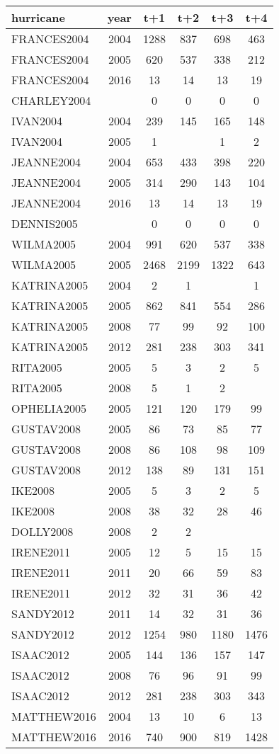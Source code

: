 \begin{tabular}{lccccc}
  \hline
hurricane & year & t+1 & t+2 & t+3 & t+4 \\ 
  \hline
FRANCES2004 & 2004 & 1288 & 837 & 698 & 463 \\ 
  FRANCES2004 & 2005 & 620 & 537 & 338 & 212 \\ 
  FRANCES2004 & 2016 & 13 & 14 & 13 & 19 \\ 
  CHARLEY2004 &  & 0 & 0 & 0 & 0 \\ 
  IVAN2004 & 2004 & 239 & 145 & 165 & 148 \\ 
  IVAN2004 & 2005 & 1 &  & 1 & 2 \\ 
  JEANNE2004 & 2004 & 653 & 433 & 398 & 220 \\ 
  JEANNE2004 & 2005 & 314 & 290 & 143 & 104 \\ 
  JEANNE2004 & 2016 & 13 & 14 & 13 & 19 \\ 
  DENNIS2005 &  & 0 & 0 & 0 & 0 \\ 
  WILMA2005 & 2004 & 991 & 620 & 537 & 338 \\ 
  WILMA2005 & 2005 & 2468 & 2199 & 1322 & 643 \\ 
  KATRINA2005 & 2004 & 2 & 1 &  & 1 \\ 
  KATRINA2005 & 2005 & 862 & 841 & 554 & 286 \\ 
  KATRINA2005 & 2008 & 77 & 99 & 92 & 100 \\ 
  KATRINA2005 & 2012 & 281 & 238 & 303 & 341 \\ 
  RITA2005 & 2005 & 5 & 3 & 2 & 5 \\ 
  RITA2005 & 2008 & 5 & 1 & 2 &  \\ 
  OPHELIA2005 & 2005 & 121 & 120 & 179 & 99 \\ 
  GUSTAV2008 & 2005 & 86 & 73 & 85 & 77 \\ 
  GUSTAV2008 & 2008 & 86 & 108 & 98 & 109 \\ 
  GUSTAV2008 & 2012 & 138 & 89 & 131 & 151 \\ 
  IKE2008 & 2005 & 5 & 3 & 2 & 5 \\ 
  IKE2008 & 2008 & 38 & 32 & 28 & 46 \\ 
  DOLLY2008 & 2008 & 2 & 2 &  &  \\ 
  IRENE2011 & 2005 & 12 & 5 & 15 & 15 \\ 
  IRENE2011 & 2011 & 20 & 66 & 59 & 83 \\ 
  IRENE2011 & 2012 & 32 & 31 & 36 & 42 \\ 
  SANDY2012 & 2011 & 14 & 32 & 31 & 36 \\ 
  SANDY2012 & 2012 & 1254 & 980 & 1180 & 1476 \\ 
  ISAAC2012 & 2005 & 144 & 136 & 157 & 147 \\ 
  ISAAC2012 & 2008 & 76 & 96 & 91 & 99 \\ 
  ISAAC2012 & 2012 & 281 & 238 & 303 & 343 \\ 
  MATTHEW2016 & 2004 & 13 & 10 & 6 & 13 \\ 
  MATTHEW2016 & 2016 & 740 & 900 & 819 & 1428 \\ 
   \hline
\end{tabular}

